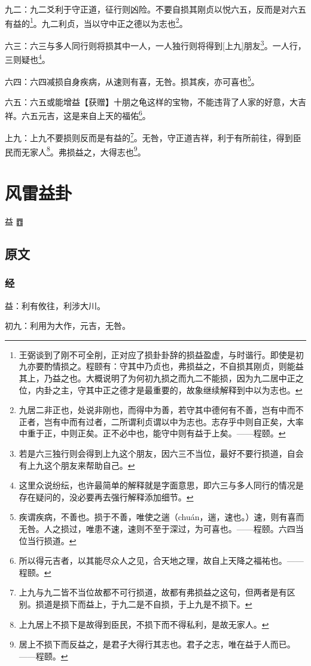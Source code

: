 \documentclass[12pt,oneside]{book}
\begin{document}
九二：九二爻利于守正道，征行则凶险。不要自损其刚贞以悦六五，反而是对六五有益的\footnote{王弼谈到了刚不可全削，正对应了损卦卦辞的损益盈虚，与时谐行。即使是初九亦要酌情损之。程颐有：守其中乃贞也，弗损益之，不自损其刚贞，则能益其上，乃益之也。大概说明了为何初九损之而九二不能损，因为九二居中正之位，内卦之主，守其中正之德才是最重要的，故象继续解释到中以为志也。}。九二利贞，当以守中正之德以为志也\footnote{九居二非正也，处说非刚也，而得中为善，若守其中德何有不善，岂有中而不正者，岂有中而有过者，二所谓利贞谓以中为志也。志存乎中则自正矣，大率中重于正，中则正矣。正不必中也，能守中则有益于上矣。——程颐。}。

六三：六三与多人同行则将损其中一人，一人独行则将得到[上九]朋友\footnote{若是六三独行则会得到上九这个朋友，因六三不当位，最好不要行损道，自会有上九这个朋友来帮助自己。}。一人行，三则疑也\footnote{这里众说纷纭，也许最简单的解释就是字面意思，即六三与多人同行的情况是存在疑问的，没必要再去强行解释添加细节。}。

六四：六四减损自身疾病，从速则有喜，无咎。损其疾，亦可喜也\footnote{疾谓疾病，不善也。损于不善，唯使之遄（chuán，遄，速也。）速，则有喜而无咎。人之损过，唯患不速，速则不至于深过，为可喜也。——程颐。六四当位当行损道。}。

六五：六五或能增益【获赠】十朋之龟这样的宝物，不能违背了人家的好意，大吉祥。六五元吉，这是来自上天的福佑\footnote{所以得元吉者，以其能尽众人之见，合天地之理，故自上天降之福祐也。——程颐。}。

上九：上九不要损则反而是有益的\footnote{上九与九二皆不当位故都不可行损道，故都有弗损益之这句，但两者是有区别。损道是损下而益上，于九二是不自损，于上九是不损下。}。无咎，守正道吉祥，利于有所前往，得到臣民而无家人\footnote{上九居上不损下是故得到臣民，不损下而不得私利，是故无家人。}。弗损益之，大得志也\footnote{居上不损下而反益之，是君子大得行其志也。君子之志，唯在益于人而已。 ——程颐。}。

\chapter{风雷益卦}
益 {\Large ䷩}
\section{原文}

\subsection{经}
益：利有攸往，利涉大川。

初九：利用为大作，元吉，无咎。
\end{document}
